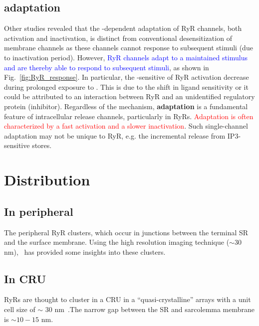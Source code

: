 \subsection{adaptation}
\label{sec:adaptation}

Other studies revealed that the -dependent adaptation of RyR
channels, both activation and inactivation, is distinct from
conventional desensitization of membrane channels as these channels
cannot response to subsequent stimuli (due to inactivation
period). However,
\textcolor{blue}{RyR channels adapt to a maintained 
  stimulus and are thereby able to respond to subsequent 
  stimuli}, as shown in Fig.~\ref{fig:RyR_response}.  In particular,
the -sensitive of RyR activation decrease during prolonged
exposure to \citep{gyorke1993ryr}. This is due to the shift
in ligand sensitivity or it could be attributed to an interaction
between RyR and an unidentified regulatory protein
(inhibitor). Regardless of the mechanism, {\bf adaptation} is a
fundamental feature of intracellular  release channels,
particularly in RyRs.
\textcolor{red}{Adaptation is often characterized by a fast
  activation and a slower inactivation}.
Such single-channel adaptation may not be unique to RyR, e.g. the
incremental  release from IP3-sensitive  stores.



\section{Distribution}
\label{sec:RYR-distribution}

\subsection{In peripheral}
\label{sec:peripheral}

The peripheral RyR clusters, which occur in junctions between the
terminal SR and the surface membrane. Using the high resolution
imaging technique ($\sim 30$nm),~\citep{Baddeley2009} has provided
some insights into these clusters.

\subsection{In CRU}
\label{sec:cru}

RyRs are thought to cluster in a CRU in a ``quasi-crystalline'' arrays
with a unit cell size of $\sim$ 30 nm~\citep{Yin2000}.The narrow gap
between the SR and sarcolemma membrane is $\sim 10-15$ nm. 

